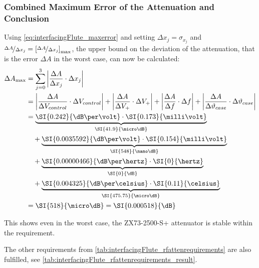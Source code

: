 \subsubsection{Combined Maximum Error of the Attenuation and Conclusion}
Using \autoref{eq:interfacingFlute_maxerror} and setting $\Delta x_j = \sigma_{x_j}$ and $\nicefrac{\Delta A}{\Delta x_j} = \left[\nicefrac{\Delta A}{\Delta x_j}\right]_\text{max}$, the upper bound on the deviation of the attenuation, that is the error $\Delta A$ in the worst case, can now be calculated:
\begin{align}
\Delta A_{\text{max}} &= \sum_{j=0}^{3} \left|\frac{\Delta A}{\Delta x_j} \cdot \Delta x_j\right|\\
                      &= \left|\frac{\Delta A}{\Delta V_{control}} \cdot \Delta V_{control}\right|
                      +  \left|\frac{\Delta A}{\Delta V_{+}} \cdot \Delta V_{+}\right|
                      +  \left|\frac{\Delta A}{\Delta f} \cdot \Delta f\right|
                      +  \left|\frac{\Delta A}{\Delta \vartheta_{case}} \cdot \Delta \vartheta_{case}\right|\\
                      &=       \underbrace{\SI{0.242}{\dB\per\volt} \cdot \SI{0.173}{\milli\volt}}_{\SI{41.9}{\micro\dB\relax}}\\
                      &\quad+  \underbrace{\SI{0.0035592}{\dB\per\volt} \cdot \SI{0.154}{\milli\volt}}_{\SI{548}{\nano\dB\relax}}\\
                      &\quad+  \underbrace{\SI{0.00000466}{\dB\per\hertz} \cdot \SI{0}{\hertz}}_{\SI{0}{\dB\relax}}\\
                      &\quad+  \underbrace{\SI{0.004325}{\dB\per\celsius} \cdot \SI{0.11}{\celsius}}_{\SI{475.75}{\micro\dB\relax}}\\
                      &= \SI{518}{\micro\dB\relax} = \SI{0.000518}{\dB}
\end{align}

This shows even in the worst case, the ZX73-2500-S+ attenuator is stable within the requirement.

The other requirements from \autoref{tab:interfacingFlute_rfattenrequirements} are also fulfilled, see \autoref{tab:interfacingFlute_rfattenrequirements_result}.

